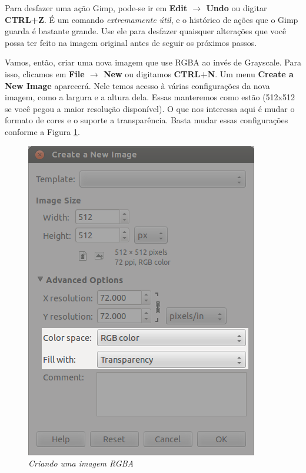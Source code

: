 \documentclass[12pt,onecolumn]{article}
\begin{document}
    \begin{framed}
      Para desfazer uma ação Gimp, pode-se ir em {\bf Edit $\rightarrow$ Undo}
      ou digitar {\bf CTRL+Z}. É um comando {\it extremamente útil}, e o
      histórico de ações que o Gimp guarda é bastante grande. Use ele para
      desfazer quaisquer alterações que você possa ter feito na imagem original
      antes de seguir os próximos passos.
    \end{framed}
    
    Vamos, então, criar uma nova imagem que use RGBA ao invés de Grayscale. Para
    isso, clicamos em {\bf File $\rightarrow$ New} ou digitamos {\bf CTRL+N}. Um
    menu {\bf Create a New Image} aparecerá. Nele temos acesso à várias
    configurações da nova imagem, como a largura e a altura dela. Essas
    manteremos como estão (512x512 se você pegou a maior resolução disponível).
    O que nos interessa aqui é mudar o formato de cores e o suporte a
    transparência. Basta mudar essas configurações conforme a Figura
    \ref{fig:grayscale_to_RGBA}.
    
    \begin{figure}[H]
      \centering
      \includegraphics[scale=.55]{screenshots/00-grayscale_to_RGBA.png}
      \caption{
        \footnotesize
        \it
        Criando uma imagem RGBA
      }
      \label{fig:grayscale_to_RGBA}
    \end{figure}
    
\end{document}
